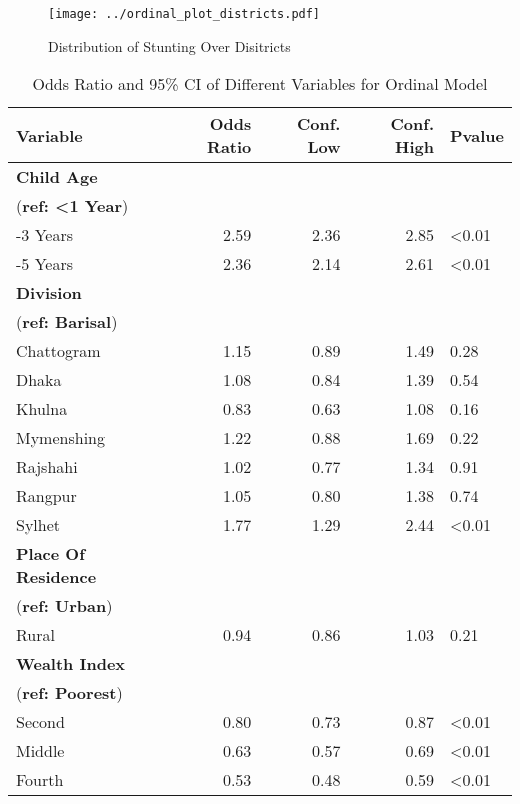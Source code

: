 \documentclass[
  letterpaper,
  DIV=11,
  numbers=noendperiod]{scrartcl}
\begin{document}
\newpage

\begin{figure}[H]

{\centering \texttt{[image: ../ordinal\_plot\_districts.pdf]}

}

\caption{Distribution of Stunting Over Disitricts}

\end{figure}%

\newpage

\begin{table}[h!]
\centering
\caption{Odds Ratio and 95\% CI of Different Variables for Ordinal Model}
\label{tab:model_ordinal}
\begin{tabular}{lrrrl}
\toprule
\textbf{Variable} & \textbf{Odds Ratio} & \textbf{Conf. Low} & \textbf{Conf. High} & \textbf{Pvalue}\\
\midrule
\textbf{Child Age} & & & & \\
(\textbf{ref: <1 Year}) \\
\quad 1-3 Years & 2.59 & 2.36 & 2.85 & <0.01\\
\quad 3-5 Years & 2.36 & 2.14 & 2.61 & <0.01\\
\addlinespace
\textbf{Division} & & & & \\
(\textbf{ref: Barisal}) \\
\quad Chattogram & 1.15 & 0.89 & 1.49 & 0.28\\
\quad Dhaka & 1.08 & 0.84 & 1.39 & 0.54\\
\quad Khulna & 0.83 & 0.63 & 1.08 & 0.16\\
\quad Mymenshing & 1.22 & 0.88 & 1.69 & 0.22\\
\quad Rajshahi & 1.02 & 0.77 & 1.34 & 0.91\\
\quad Rangpur & 1.05 & 0.80 & 1.38 & 0.74\\
\quad Sylhet & 1.77 & 1.29 & 2.44 & <0.01\\
\addlinespace
\textbf{Place Of Residence} & & & & \\
(\textbf{ref: Urban}) \\
\quad Rural & 0.94 & 0.86 & 1.03 & 0.21\\
\addlinespace
\textbf{Wealth Index} & & & & \\
(\textbf{ref: Poorest}) \\
\quad Second & 0.80 & 0.73 & 0.87 & <0.01\\
\quad Middle & 0.63 & 0.57 & 0.69 & <0.01\\
\quad Fourth & 0.53 & 0.48 & 0.59 & <0.01\\

\end{tabular}
\end{table}
\end{document}
